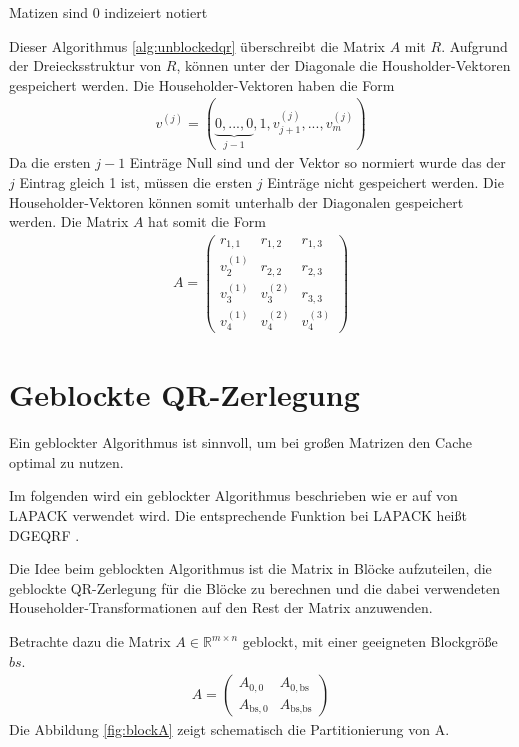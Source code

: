 Matizen sind 0 indizeiert notiert

Dieser Algorithmus \ref{alg:unblockedqr} überschreibt die Matrix $A$ mit $R$.
Aufgrund der Dreiecksstruktur von $R$,
können unter der Diagonale die Housholder-Vektoren gespeichert werden. 
Die Householder-Vektoren haben die Form 
\begin{align*}
v^{(j)} = ( \underbrace{0,...,0}_{j-1},1,	v_{j+1}^{(j)},...,v_{m}^{(j)}  )
\end{align*}
Da die ersten $j-1$ Einträge Null sind und der Vektor so normiert wurde das der $j$ Eintrag gleich 1 ist, müssen die ersten $j$ Einträge nicht gespeichert werden.
Die Householder-Vektoren können somit unterhalb der Diagonalen gespeichert werden.
Die Matrix $A$ hat somit die Form
\begin{align*}
	A = 
	\left(\begin{array}{ccc}
	r_{1,1}   &  r_{1,2}  & r_{1,3} \\ 
	v_2^{(1)} &  r_{2,2}  & r_{2,3} \\ 
	v_3^{(1)} & v_3^{(2)} & r_{3,3} \\ 
	v_4^{(1)} & v_4^{(2)} & v_4^{(3)}
	\end{array} \right) 
\end{align*}


\section{Geblockte QR-Zerlegung}
Ein geblockter Algorithmus ist sinnvoll, um bei großen Matrizen den Cache optimal zu nutzen.

Im folgenden wird ein geblockter Algorithmus beschrieben wie er auf von LAPACK verwendet wird. Die entsprechende Funktion bei LAPACK heißt \glqq DGEQRF\grqq{} \cite{DGEQRF}.

Die Idee beim geblockten Algorithmus ist die Matrix in Blöcke aufzuteilen, die geblockte QR-Zerlegung für die Blöcke zu berechnen und die dabei verwendeten Householder-Transformationen auf den Rest der Matrix anzuwenden.


Betrachte dazu die Matrix $A \in \mathbb{R}^{m \times n}$ geblockt, mit einer geeigneten Blockgröße $bs$.
\begin{align}
	A = \left(\begin{array}{l|l}
	A_{0, 0} & A_{0, \text{bs}} \\ \hline
	A_{\text{bs}, 0}   & A_{\text{bs}, \text{bs}} 	
	\end{array} \right) \label{equ:blockA}
\end{align}
Die Abbildung \ref{fig:blockA} zeigt schematisch die Partitionierung von A.

